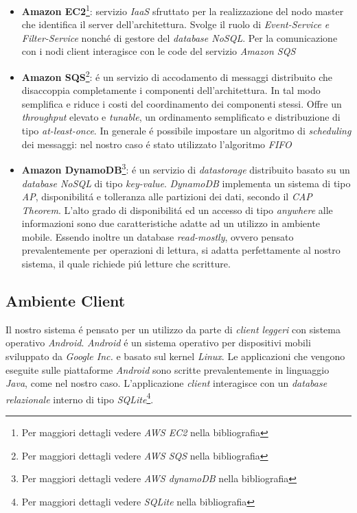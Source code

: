 \documentclass{article}
\begin{document}
\begin{itemize}
\item{\textbf{Amazon EC2}\footnote{Per maggiori dettagli vedere \textit{AWS EC2} nella bibliografia}: servizio \textit{IaaS} sfruttato per la realizzazione del nodo master che identifica il server dell'architettura. Svolge il ruolo di \textit{Event-Service e Filter-Service} nonch\'e di gestore del \textit{database NoSQL}. Per la comunicazione con i nodi client interagisce con le code del servizio \textit{Amazon SQS}}
\item{\textbf{Amazon SQS}\footnote{Per maggiori dettagli vedere \textit{AWS SQS} nella bibliografia}: \'e un servizio di accodamento di messaggi distribuito che disaccoppia completamente i componenti dell'architettura. In tal modo semplifica e riduce i costi del coordinamento dei componenti stessi. Offre un \textit{throughput} elevato e \textit{tunable}, un ordinamento semplificato e distribuzione di tipo \textit{at-least-once}. In generale \'e possibile impostare un algoritmo di \textit{scheduling} dei messaggi: nel nostro caso \'e stato utilizzato l'algoritmo \textit{FIFO}}
\item{\textbf{Amazon DynamoDB}\footnote{Per maggiori dettagli vedere \textit{AWS dynamoDB} nella bibliografia}: \'e un servizio di \textit{datastorage} distribuito basato su un \textit{database NoSQL} di tipo \textit{key-value}. \textit{DynamoDB} implementa un sistema di tipo \textit{AP}, disponibilit\'a e tolleranza alle partizioni dei dati, secondo il \textit{CAP Theorem}. L'alto grado di disponibilit\'a ed un accesso di tipo \textit{anywhere} alle informazioni sono due caratteristiche adatte ad un utilizzo in ambiente mobile. Essendo inoltre un database \textit{read-mostly}, ovvero pensato prevalentemente per operazioni di lettura, si adatta perfettamente al nostro sistema, il quale richiede pi\'u letture che scritture.}
\end{itemize}

\subsection{Ambiente Client}
Il nostro sistema \'e pensato per un utilizzo da parte di \textit{client leggeri} con sistema operativo \textit{Android}. \textit{Android} \'e un sistema operativo per dispositivi mobili sviluppato da \textit{Google Inc.} e basato sul kernel \textit{Linux}. Le applicazioni che vengono eseguite sulle piattaforme \textit{Android} sono scritte prevalentemente in linguaggio \textit{Java}, come nel nostro caso. L'applicazione \textit{client} interagisce con un \textit{database relazionale} interno di tipo \textit{SQLite}\footnote{Per maggiori dettagli vedere \textit{SQLite} nella bibliografia}.
\end{document}
